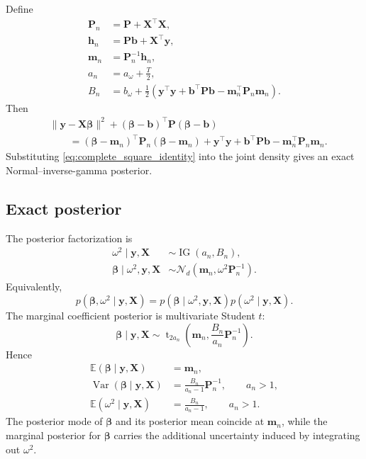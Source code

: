 \documentclass[11pt]{article}
\newcommand{\E}{\mathbb{E}}
\newcommand{\Var}{\operatorname{Var}}
\newcommand{\vect}[1]{\bm{#1}}
\newcommand{\mat}[1]{\bm{#1}}
\newcommand{\Normal}{\mathcal{N}}
\newcommand{\IG}{\operatorname{IG}}
\newcommand{\StudentT}{\operatorname{t}}
\begin{document}
Define
\begin{align}
\mat P_n&=\mat P+\mat X^\top\mat X,
\label{eq:Pn}\\
\vect h_n&=\mat P\vect b+\mat X^\top\vect y,
\label{eq:hn}\\
\vect m_n&=\mat P_n^{-1}\vect h_n,
\label{eq:mn}\\
a_n&=a_\omega+\frac{T}{2},
\label{eq:an}\\
B_n&=b_\omega+\frac12\left(
\vect y^\top\vect y+
\vect b^\top\mat P\vect b-
\vect m_n^\top\mat P_n\vect m_n
\right).
\label{eq:Bn}
\end{align}
Then
\begin{align}
\label{eq:complete_square_identity}
&\|\vect y-\mat X\vect\beta\|^2
+(\vect\beta-\vect b)^\top\mat P(\vect\beta-\vect b)
\nonumber\\
&\qquad=
(\vect\beta-\vect m_n)^\top\mat P_n(\vect\beta-\vect m_n)
+\vect y^\top\vect y+
\vect b^\top\mat P\vect b-
\vect m_n^\top\mat P_n\vect m_n.
\end{align}
Substituting \eqref{eq:complete_square_identity} into the joint density gives
an exact Normal--inverse-gamma posterior.

\subsection{Exact posterior}
\label{subsec:exact_posterior}

The posterior factorization is
\begin{align}
\omega^2\mid\vect y,\mat X&\sim\IG(a_n,B_n),
\label{eq:omega_posterior}\\
\vect\beta\mid\omega^2,\vect y,\mat X
&\sim\Normal_d(\vect m_n,\omega^2\mat P_n^{-1}).
\label{eq:beta_cond_posterior}
\end{align}
Equivalently,
\begin{equation}
\label{eq:joint_posterior_kernel}
p(\vect\beta,\omega^2\mid\vect y,\mat X)
=p(\vect\beta\mid\omega^2,\vect y,\mat X)p(\omega^2\mid\vect y,\mat X).
\end{equation}
The marginal coefficient posterior is multivariate Student \(t\):
\begin{equation}
\label{eq:beta_student_posterior}
\vect\beta\mid\vect y,\mat X
\sim
\StudentT_{2a_n}\left(\vect m_n,\frac{B_n}{a_n}\mat P_n^{-1}\right).
\end{equation}
Hence
\begin{align}
\E(\vect\beta\mid\vect y,\mat X)&=\vect m_n,
\label{eq:posterior_mean_beta}\\
\Var(\vect\beta\mid\vect y,\mat X)
&=\frac{B_n}{a_n-1}\mat P_n^{-1},
\qquad a_n>1,
\label{eq:posterior_var_beta}\\
\E(\omega^2\mid\vect y,\mat X)&=\frac{B_n}{a_n-1},
\qquad a_n>1.
\label{eq:posterior_mean_omega}
\end{align}
The posterior mode of \(\vect\beta\) and its posterior mean coincide at
\(\vect m_n\), while the marginal posterior for \(\vect\beta\) carries the
additional uncertainty induced by integrating out \(\omega^2\).
\end{document}
